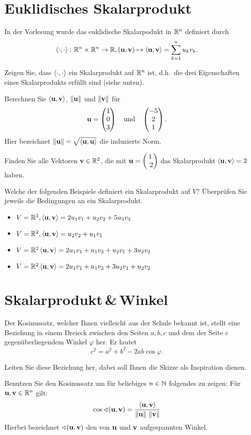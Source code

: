 \documentclass{scrartcl}
\newcommand{\uu}{\mat u}
\newcommand{\vv}{\mat v}
\begin{document}
\section{Euklidisches Skalarprodukt}
In der Vorlesung wurde das euklidische Skalarpodukt in $\RR^n$ definiert durch
\[
  \sp{\cdot}{\cdot} \colon \RR^n \times \RR^n \to \RR, (\uu, \vv) \mapsto \sp{\uu}{\vv} = \sum_{k=1}^n u_k v_k.
\]
\begin{subex}
  \item Zeigen Sie, dass $\sp{\cdot}{\cdot}$ ein Skalarprodukt auf $\RR^n$ ist, d.h.\ die drei Eigenschaften eines Skalarprodukts erfüllt sind (siehe unten).
  \item Berechnen Sie $\sp{\uu}{\vv}$, $\norm{\uu}$ und $\norm{\vv}$ für 
  \[
    \uu = \colvec{1 \\ 0 \\ 3} \quad\mbox{und}\quad \colvec{-5 \\ 2 \\ 1}.
  \]
  Hier bezeichnet $\norm{\uu} = \sqrt{\sp{\uu}{\uu}}$ die induzierte Norm.
  \item Finden Sie alle Vektoren $\vv \in \RR^2$, die mit $\uu = \colvec{1 \\ 2}$ das Skalarprodukt $\sp{\uu}{\vv} = 2$ haben.  
  \item Welche der folgenden Beispiele definiert ein Skalarprodukt auf $V$?
  Überprüfen Sie jeweils die Bedingungen an ein Skalarprodukt.
  \begin{itemize}
    \item $V = \RR^3, \sp{\uu}{\vv} = 2u_1 v_1 +u_2 v_2 +5u_3 v_3$
    \item $V = \RR^2, \sp{\uu}{\vv} = u_2 v_2 + u_1 v_1$
    \item $V =\RR^2 \sp{\uu}{\vv} = 2u_1 v_1 + u_1 v_2 + u_2 v_1 + 3u_2 v_2$
    \item $V =\RR^2 \sp{\uu}{\vv} = 2u_1 v_1 + u_1 v_2 + 3u_2 v_1 + u_2 v_2$
  \end{itemize}
\end{subex}


\section{Skalarprodukt\,\&\,Winkel}
Der Kosinussatz, welcher Ihnen vielleicht aus der Schule bekannt ist, stellt eine Beziehung in einem Dreieck zwischen den Seiten $a,b,c$ und dem der Seite $c$ gegenüberliegendem Winkel $\varphi$ her.
Er lautet
  \[
  c^2=a^2+b^2-2ab\cos \varphi.
  \]
\begin{subex}
  \item Leiten Sie diese Beziehung her, dabei soll Ihnen die Skizze als Inspiration dienen.
  \item Benutzen Sie den Kosinussatz um für beliebiges $n \in \NN$ folgendes zu zeigen: Für $\uu, \vv \in \RR^n$ gilt:
  \[
    \cos \sphericalangle(\uu,\vv) = \frac{\sp{\uu}{\vv}}{\norm{\uu}\,\norm{\vv}}
  \] 
  Hierbei bezeichnet $\sphericalangle(\uu,\vv)$ den von $\uu$ und $\vv$ aufgespannten Winkel.
\end{subex}
\end{document}
